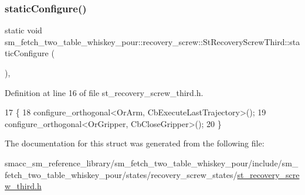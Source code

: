 \subsubsection{\texorpdfstring{static\+Configure()}{staticConfigure()}}
{\footnotesize\ttfamily static void sm\+\_\+fetch\+\_\+two\+\_\+table\+\_\+whiskey\+\_\+pour\+::recovery\+\_\+screw\+::\+St\+Recovery\+Screw\+Third\+::static\+Configure (\begin{DoxyParamCaption}{ }\end{DoxyParamCaption})\hspace{0.3cm}{\ttfamily [inline]}, {\ttfamily [static]}}



Definition at line 16 of file st\+\_\+recovery\+\_\+screw\+\_\+third.\+h.


\begin{DoxyCode}
17             \{
18                 configure\_orthogonal<OrArm, CbExecuteLastTrajectory>();
19                 configure\_orthogonal<OrGripper, CbCloseGripper>();
20             \}
\end{DoxyCode}


The documentation for this struct was generated from the following file\+:\begin{DoxyCompactItemize}
\item 
smacc\+\_\+sm\+\_\+reference\+\_\+library/sm\+\_\+fetch\+\_\+two\+\_\+table\+\_\+whiskey\+\_\+pour/include/sm\+\_\+fetch\+\_\+two\+\_\+table\+\_\+whiskey\+\_\+pour/states/recovery\+\_\+screw\+\_\+states/\hyperlink{sm__fetch__two__table__whiskey__pour_2include_2sm__fetch__two__table__whiskey__pour_2states_2rec49ff4325215c1842022bc89738480f1a}{st\+\_\+recovery\+\_\+screw\+\_\+third.\+h}\end{DoxyCompactItemize}

